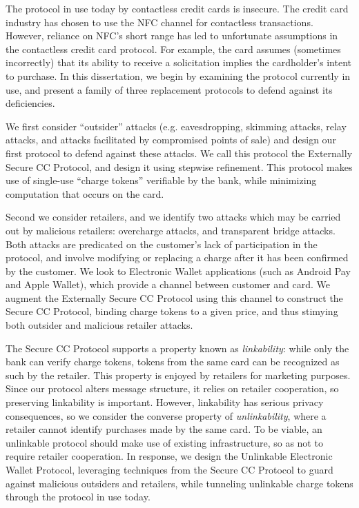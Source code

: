 The protocol in use today by contactless credit cards is insecure.
The credit card industry has chosen to use the NFC channel for contactless transactions.
However, reliance on NFC's short range has led to unfortunate assumptions in the contactless credit card protocol.
For example, the card assumes (sometimes incorrectly) that its ability to receive a solicitation implies the cardholder's intent to purchase.
In this dissertation, we begin by examining the protocol currently in use,
    and present a family of three replacement protocols to defend against its deficiencies.

We first consider ``outsider'' attacks (e.g. eavesdropping, skimming attacks, relay attacks, and attacks facilitated by compromised points of sale)
    and design our first protocol to defend against these attacks.
We call this protocol the Externally Secure CC Protocol, and design it using stepwise refinement.
This protocol makes use of single-use ``charge tokens'' verifiable by the bank, while minimizing computation that occurs on the card.

Second we consider retailers, and we identify two attacks which may be carried out by malicious retailers:
    overcharge attacks, and transparent bridge attacks.
Both attacks are predicated on the customer's lack of participation in the protocol,
    and involve modifying or replacing a charge after it has been confirmed by the customer.
We look to Electronic Wallet applications (such as Android Pay and Apple Wallet), which provide a channel between customer and card.
We augment the Externally Secure CC Protocol using this channel to construct the Secure CC Protocol,
    binding charge tokens to a given price, and thus stimying both outsider and malicious retailer attacks.

The Secure CC Protocol supports a property known as \emph{linkability}:
    while only the bank can verify charge tokens, tokens from the same card can be recognized as such by the retailer.
This property is enjoyed by retailers for marketing purposes.
Since our protocol alters message structure, it relies on retailer cooperation, so preserving linkability is important.
However, linkability has serious privacy consequences, so we consider the converse property of
    \emph{unlinkability}, where a retailer cannot identify purchases made by the same card.
To be viable, an unlinkable protocol should make use of existing infrastructure, so as not to require retailer cooperation.
In response, we design the Unlinkable Electronic Wallet Protocol,
    leveraging techniques from the Secure CC Protocol to guard against malicious outsiders and retailers,
    while tunneling unlinkable charge tokens through the protocol in use today.
